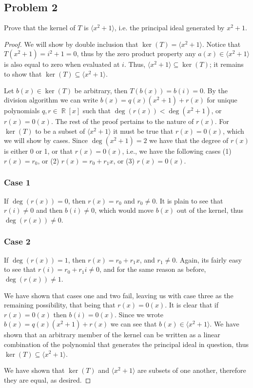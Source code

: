 \documentclass[letterpaper, 12pt]{amsart}
\DeclareMathOperator{\R}{\mathbb{R}}
\newcommand{\pid}[1]{\langle #1 \rangle}
\begin{document}
		\subsection*{Problem 2}
		\label{sub:problem_2}
		Prove that the kernel of $T$ is $\pid{x^{2} + 1}$, i.e. the principal ideal generated by $x^{2} + 1$.
			\begin{proof} 
			We will show by double inclusion that $\ker{(T)} = \pid{x^{2} + 1}$.
			Notice that $T(x^{2} + 1) = i^{2} + 1 = 0$, thus by the zero product property any $a(x) \in \pid{x^{2} + 1}$ is also equal to zero when evaluated at $i$.
			Thus, $\pid{x^{2} + 1} \subseteq \ker{(T)}$; it remains to show that $\ker{(T)} \subseteq \pid{x^{2} + 1}$.

			Let $b(x) \in \ker{(T)}$ be arbitrary, then $T(b(x)) = b(i) = 0$.
			By the division algorithm we can write $b(x) = q(x)(x^{2} + 1) + r(x)$ for unique polynomials $q,r \in \R[x]$ such that $\deg(r(x)) < \deg(x^{2} + 1)$, or $r(x) = 0(x)$.
			The rest of the proof pertains to the nature of $r(x)$.
			For $\ker{(T)}$ to be a subset of $\pid{x^{2}+1}$ it must be true that $r(x) = 0(x)$, which we will show by cases.
			Since $\deg(x^{2}+1) = 2$ we have that the degree of $r(x)$ is either 0 or 1, or that $r(x) = 0(x)$, i.e., we have the following cases (1) $r(x) = r_{0}$, or (2) $r(x) = r_{0} + r_{1}x$, or (3) $r(x) = 0(x)$.

				\subsubsection*{Case 1}
				\label{ssub:case_1}
				If $\deg(r(x)) = 0$, then $r(x) = r_{0}$ and $r_{0} \neq 0$. 
				It is plain to see that $r(i) \neq 0$ and then $b(i) \neq 0$, which would move $b(x)$ out of the kernel, thus $\deg(r(x)) \neq 0$.

				\subsubsection*{Case 2}
				\label{ssub:case_2}
				If $\deg(r(x)) = 1$, then $r(x) = r_{0} + r_{1}x$, and $r_{1} \neq 0$.
				Again, its fairly easy to see that $r(i) = r_{0} + r_{1}i \neq 0$, and for the same reason as before, $\deg(r(x)) \neq 1$.\\
				\vspace*{1.5mm}

			We have shown that cases one and two fail, leaving us with case three as the remaining possibility, that being that $r(x) = 0(x)$.
			It is clear that if $r(x) = 0(x)$ then $b(i) = 0(x)$.
			Since we wrote $b(x) = q(x)(x^{2}+1) + r(x)$ we can see that $b(x) \in \pid{x^{2} + 1}$.
			We have shown that an arbitrary member of the kernel can be written as a linear combination of the polynomial that generates the principal ideal in question, thus $\ker{(T)} \subseteq \pid{x^{2} + 1}$.

			We have shown that $\ker{(T)}$ and $\pid{x^{2} + 1}$ are subsets of one another, therefore they are equal, as desired.
			\end{proof}
\end{document}
